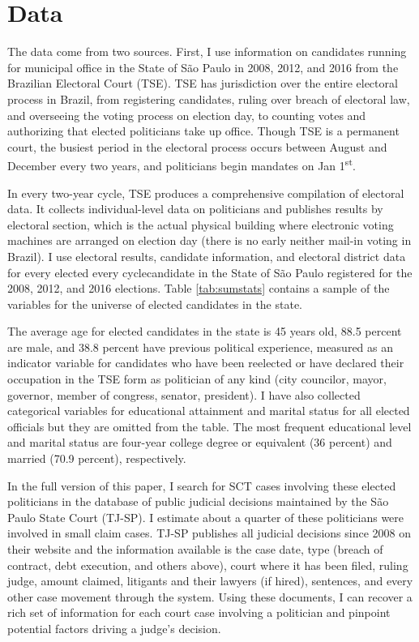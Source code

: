 \documentclass[11pt]{article}
\begin{document}
\section{Data} \label{sec:data_paper2}

The data come from two sources. First, I use information on candidates running for municipal office in the State of São Paulo in 2008, 2012, and 2016 from the Brazilian Electoral Court (TSE). TSE has jurisdiction over the entire electoral process in Brazil, from registering candidates, ruling over breach of electoral law, and overseeing the voting process on election day, to counting votes and authorizing that elected politicians take up office. Though TSE is a permanent court, the busiest period in the electoral process occurs between August and December every two years, and politicians begin mandates on Jan 1\textsuperscript{st}.

In every two-year cycle, TSE produces a comprehensive compilation of electoral data. It collects individual-level data on politicians and publishes results by electoral section, which is the actual physical building where electronic voting machines are arranged on election day (there is no early neither mail-in voting in Brazil). I use electoral results, candidate information, and electoral district data for every elected every cyclecandidate in the State of São Paulo registered for the 2008, 2012, and 2016 elections. Table \ref{tab:sumstats} contains a sample of the variables for the universe of elected candidates in the state.



The average age for elected candidates in the state is 45 years old, 88.5 percent are male, and 38.8 percent have previous political experience, measured as an indicator variable for candidates who have been reelected or have declared their occupation in the TSE form as politician of any kind (city councilor, mayor, governor, member of congress, senator, president). I have also collected categorical variables for educational attainment and marital status for all elected officials but they are omitted from the table. The most frequent educational level and marital status are four-year college degree or equivalent (36 percent) and married (70.9 percent), respectively.

In the full version of this paper, I search for SCT cases involving these elected politicians in the database of public judicial decisions maintained by the São Paulo State Court (TJ-SP). I estimate about a quarter of these politicians were involved in small claim cases. TJ-SP publishes all judicial decisions since 2008 on their website and the information available is the case date, type (breach of contract, debt execution, and others above), court where it has been filed, ruling judge, amount claimed, litigants and their lawyers (if hired), sentences, and every other case movement through the system. Using these documents, I can recover a rich set of information for each court case involving a politician and pinpoint potential factors driving a judge's decision.
\end{document}
